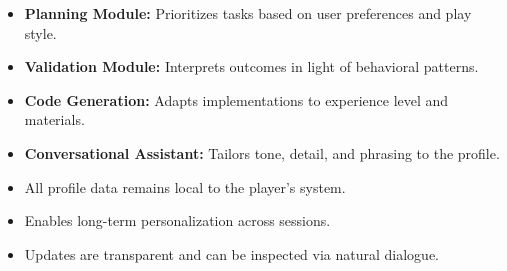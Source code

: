 \noindent
\begin{tcolorbox}[appxbox, title=System-Wide Usage, fonttitle=\bfseries]
\begin{itemize}
  \item \textbf{Planning Module:} Prioritizes tasks based on user preferences and play style.
  \item \textbf{Validation Module:} Interprets outcomes in light of behavioral patterns.
  \item \textbf{Code Generation:} Adapts implementations to experience level and materials.
  \item \textbf{Conversational Assistant:} Tailors tone, detail, and phrasing to the profile.
\end{itemize}
\end{tcolorbox}

\noindent
\begin{tcolorbox}[appxbox, title=Privacy and Persistence, fonttitle=\bfseries]
\begin{itemize}
  \item All profile data remains local to the player’s system.
  \item Enables long-term personalization across sessions.
  \item Updates are transparent and can be inspected via natural dialogue.
\end{itemize}
\end{tcolorbox}


\FloatBarrier

\BackToTwoColumn
